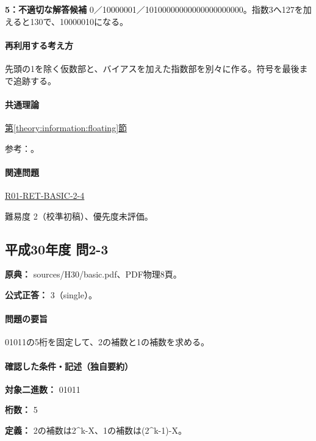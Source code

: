 \noindent\textbf{5：不適切な解答候補} 0／10000001／10100000000000000000000。指数3へ127を加えると130で、10000010になる。\par

\paragraph{再利用する考え方} 先頭の1を除く仮数部と、バイアスを加えた指数部を別々に作る。符号を最後まで追跡する。

\paragraph{共通理論} \hyperref[theory:information:floating]{第\ref*{theory:information:floating}節}

\par 参考：\cite{oracle_single}。

\paragraph{関連問題} \hyperref[q:r01-ret-basic-2-4]{R01-RET-BASIC-2-4}

\par 難易度 2（校準初稿）、優先度未評価。

\subsection{平成30年度 問2-3}
\label{q:h30-reg-basic-2-3}

\noindent\textbf{原典：} sources/H30/basic.pdf、PDF物理8頁。

\textbf{公式正答：} 3（single）。

\paragraph{問題の要旨} 01011の5桁を固定して、2の補数と1の補数を求める。

\paragraph{確認した条件・記述（独自要約）}\mbox{}\par

\noindent\textbf{対象二進数：} 01011\par

\noindent\textbf{桁数：} 5\par

\noindent\textbf{定義：} 2の補数は2\textasciicircum{}k-X、1の補数は(2\textasciicircum{}k-1)-X。\par

